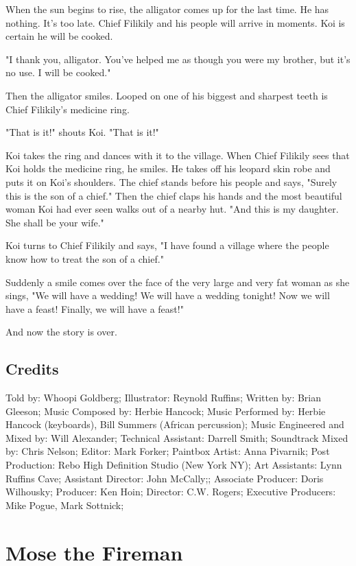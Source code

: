 When the sun begins to rise, the alligator comes up for the last time. He has nothing. It's too late. Chief Filikily and his people will arrive in moments. Koi is certain he will be cooked.

"I thank you, alligator. You've helped me as though you were my brother, but it's no use. I will be cooked."

Then the alligator smiles. Looped on one of his biggest and sharpest teeth is Chief Filikily's medicine ring.

"That is it!" shouts Koi. "That is it!"

Koi takes the ring and dances with it to the village. When Chief Filikily sees that Koi holds the medicine ring, he smiles. He takes off his leopard skin robe and puts it on Koi's shoulders. The chief stands before his people and says, "Surely this is the son of a chief." Then the chief claps his hands and the most beautiful woman Koi had ever seen walks out of a nearby hut. "And this is my daughter. She shall be your wife."

Koi turns to Chief Filikily and says, "I have found a village where the people know how to treat the son of a chief."

Suddenly a smile comes over the face of the very large and very fat woman as she sings, "We will have a wedding! We will have a wedding tonight! Now we will have a feast! Finally, we will have a feast!"

And now the story is over.

\subsection{Credits}

Told by: Whoopi Goldberg;
Illustrator: Reynold Ruffins;
Written by: Brian Gleeson;
Music Composed by: Herbie Hancock;
Music Performed by: Herbie Hancock (keyboards), Bill Summers (African percussion);
Music Engineered and Mixed by: Will Alexander;
Technical Assistant: Darrell Smith;
Soundtrack Mixed by: Chris Nelson;
Editor: Mark Forker;
Paintbox Artist: Anna Pivarnik;
Post Production: Rebo High Definition Studio (New York NY);
Art Assistants: Lynn Ruffins Cave;
Assistant Director: John McCally;;
Associate Producer: Doris Wilhousky;
Producer: Ken Hoin;
Director: C.W. Rogers;
Executive Producers: Mike Pogue, Mark Sottnick;

\section{Mose the Fireman}

